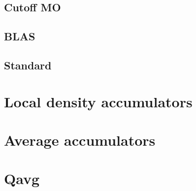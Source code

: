 \documentclass[12pt]{article}
\begin{document}
\subsection{Cutoff MO}
\subsection{BLAS} 
\subsection{Standard}

\section{Local density accumulators}

\section{Average accumulators}

\section{Qavg}
\end{document}

